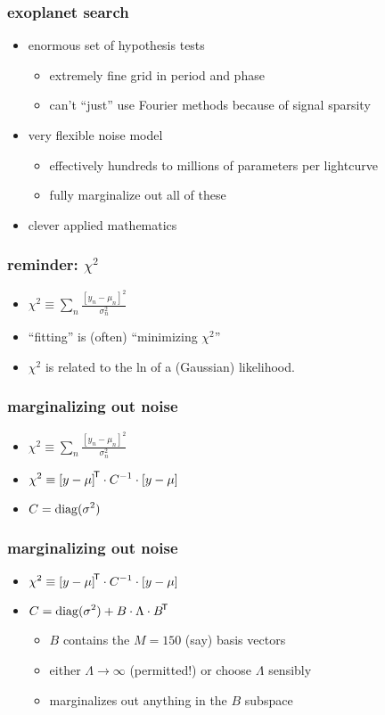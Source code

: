\documentclass[pdftex]{beamer}
\begin{document}
\begin{frame}
  \frametitle{exoplanet search}
  \begin{itemize}
  \item enormous set of hypothesis tests
    \begin{itemize}
    \item extremely fine grid in period and phase
    \item can't ``just'' use Fourier methods because of signal sparsity
    \end{itemize}
  \item very flexible noise model
    \begin{itemize}
    \item effectively hundreds to millions of parameters per lightcurve
    \item fully marginalize out all of these
    \end{itemize}
  \item clever applied mathematics
  \end{itemize}
\end{frame}

\begin{frame}
  \frametitle{reminder: $\chi^2$}
  \begin{itemize}
  \item $\displaystyle\chi^2\equiv\sum_n\frac{[y_n - \mu_n]^2}{\sigma_n^2}$
  \item ``fitting'' is (often) ``minimizing $\chi^2$''
  \item $\chi^2$ is related to the ln of a (Gaussian) likelihood.
  \end{itemize}
\end{frame}

\begin{frame}
  \frametitle{marginalizing out noise}
  \begin{itemize}
  \item $\displaystyle\chi^2\equiv\sum_n\frac{[y_n - \mu_n]^2}{\sigma_n^2}$
  \item $\displaystyle\chi^2\equiv{[y - \mu]}^{\mathsf{\!T}}\cdot C^{-1}\cdot[y - \mu]$
  \item $\displaystyle C = \operatorname*{diag}(\sigma^2)$
  \end{itemize}
\end{frame}

\begin{frame}
  \frametitle{marginalizing out noise}
  \begin{itemize}
  \item $\displaystyle\chi^2\equiv{[y - \mu]}^{\mathsf{\!T}}\cdot C^{-1}\cdot[y - \mu]$
  \item $\displaystyle C = \operatorname*{diag}(\sigma^2) + B\cdot\Lambda\cdot{B}^{\mathsf{\!T}}$
    \begin{itemize}
    \item $B$ contains the $M=150$ (say) basis vectors
    \item either $\Lambda\rightarrow\infty$ (permitted!) or choose $\Lambda$ sensibly
    \item marginalizes out anything in the $B$ subspace
    \end{itemize}
  \end{itemize}
\end{frame}
\end{document}
